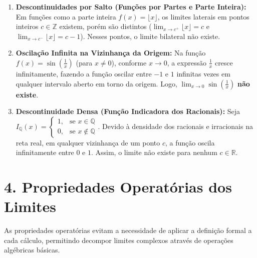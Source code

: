 \documentclass[12pt,a4paper]{article}
\begin{document}
\begin{enumerate}[leftmargin=*]
    \item \textbf{Descontinuidades por Salto (Funções por Partes e Parte Inteira):} Em funções como a parte inteira $f(x) = \lfloor x \rfloor$, os limites laterais em pontos inteiros $c \in \mathbb{Z}$ existem, porém são distintos ($\lim_{x \to c^+} \lfloor x \rfloor = c$ e $\lim_{x \to c^-} \lfloor x \rfloor = c-1$). Nesses pontos, o limite bilateral não existe.
    \item \textbf{Oscilação Infinita na Vizinhança da Origem:} Na função $f(x) = \sin\left(\frac{1}{x}\right)$ (para $x \neq 0$), conforme $x \to 0$, a expressão $\frac{1}{x}$ cresce infinitamente, fazendo a função oscilar entre $-1$ e $1$ infinitas vezes em qualquer intervalo aberto em torno da origem. Logo, $\lim_{x \to 0} \sin\left(\frac{1}{x}\right)$ \textbf{não existe}.
    \item \textbf{Descontinuidade Densa (Função Indicadora dos Racionais):} Seja $I_{\mathbb{Q}}(x) = \begin{cases} 1, & \text{se } x \in \mathbb{Q} \\ 0, & \text{se } x \notin \mathbb{Q} \end{cases}$. Devido à densidade dos racionais e irracionais na reta real, em qualquer vizinhança de um ponto $c$, a função oscila infinitamente entre $0$ e $1$. Assim, o limite não existe para nenhum $c \in \mathbb{R}$.
\end{enumerate}

\vspace{0.4cm}

\section*{4. Propriedades Operatórias dos Limites}

As propriedades operatórias evitam a necessidade de aplicar a definição formal a cada cálculo, permitindo decompor limites complexos através de operações algébricas básicas.
\end{document}
